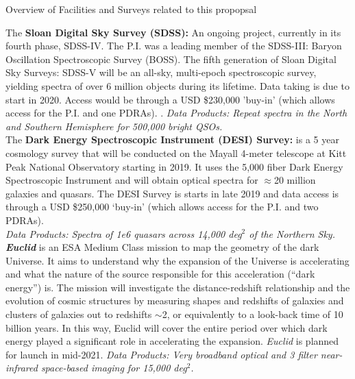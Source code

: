 \begin{framed}
\begin{tcolorbox}
\begin{center} 
  Overview of Facilities and Surveys related to this propopsal
\end{center}
\end{tcolorbox}

The {\bf Sloan Digital Sky Survey (SDSS):} An ongoing project, currently in its fourth phase, SDSS-IV.  
The P.I. was a leading member of the SDSS-III: Baryon Oscillation Spectroscopic Survey (BOSS). 
The fifth generation of Sloan Digital Sky Surveys: SDSS-V will be an all-sky, multi-epoch spectroscopic 
survey, yielding spectra of over 6 million objects during its lifetime. Data taking is due to start in 
2020. Access would be through a USD \$230,000 'buy-in' (which allows access for the P.I. and one PDRAs).  . 
{\it Data Products: Repeat spectra in the North and Southern Hemisphere for 500,000 bright QSOs.} \\

The {\bf Dark Energy Spectroscopic Instrument (DESI) Survey:} is a 5 year cosmology survey 
that will be conducted on the Mayall 4-meter telescope at Kitt Peak National Observatory starting 
in 2019. It uses the 5,000 fiber Dark Energy Spectroscopic Instrument and will obtain optical 
spectra for $\approx$20 million galaxies and quasars. The DESI Survey is starts in late 2019 
and data access is through a USD \$250,000 `buy-in' (which allows access for the P.I. and two PDRAs).  \\
{\it Data Products: Spectra of 1e6 quasars across 14,000 deg$^{2}$ of the Northern Sky.} \\

\textit{\textbf{Euclid}} is an ESA Medium Class mission to map the geometry of the dark Universe.
It aims to understand why the expansion of the Universe is accelerating and what the nature 
of the source responsible for this acceleration (``dark energy'') is. 
The
mission will investigate the distance-redshift relationship and the
evolution of cosmic structures by measuring shapes and redshifts of
galaxies and clusters of galaxies out to redshifts $\sim$2, or equivalently
to a look-back time of 10 billion years. In this way, Euclid will
cover the entire period over which dark energy played a significant
role in accelerating the expansion.
{\it Euclid} is planned for launch in mid-2021. 
{\it Data Products: Very broadband optical and 3 filter near-infrared space-based imaging for 15,000 deg$^2$.} \\


\end{framed}
